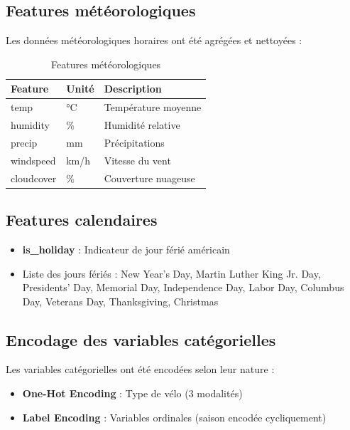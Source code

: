 \documentclass[12pt,a4paper]{article}
\begin{document}
\subsection{Features météorologiques}

Les données météorologiques horaires ont été agrégées et nettoyées :

\begin{table}[H]
\centering
\caption{Features météorologiques}
\label{tab:weather_features}
\begin{tabular}{llp{6cm}}
\toprule
\textbf{Feature} & \textbf{Unité} & \textbf{Description} \\
\midrule
temp & °C & Température moyenne \\
humidity & \% & Humidité relative \\
precip & mm & Précipitations \\
windspeed & km/h & Vitesse du vent \\
cloudcover & \% & Couverture nuageuse \\
\bottomrule
\end{tabular}
\end{table}

\subsection{Features calendaires}

\begin{itemize}
    \item \textbf{is\_holiday} : Indicateur de jour férié américain
    \item Liste des jours fériés : New Year's Day, Martin Luther King Jr. Day, Presidents' Day, Memorial Day, Independence Day, Labor Day, Columbus Day, Veterans Day, Thanksgiving, Christmas
\end{itemize}

\subsection{Encodage des variables catégorielles}

Les variables catégorielles ont été encodées selon leur nature :
\begin{itemize}
    \item \textbf{One-Hot Encoding} : Type de vélo (3 modalités)
    \item \textbf{Label Encoding} : Variables ordinales (saison encodée cycliquement)
\end{itemize}
\end{document}
